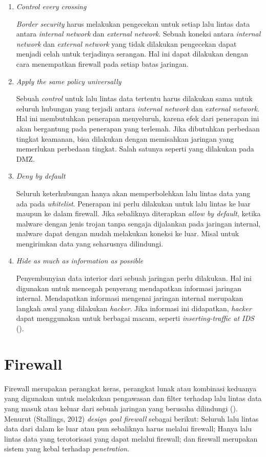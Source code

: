 \begin{enumerate}
	\item \textit{Control every crossing}
	
	\textit{Border security} harus melakukan pengecekan untuk setiap lalu lintas data antara \textit{internal network} dan \textit{external network}. Sebuah koneksi antara \textit{internal network} dan \textit{external network} yang tidak dilakukan pengecekan
	dapat menjadi celah untuk terjadinya serangan. Hal ini dapat dilakukan dengan cara menempatkan firewall pada setiap batas jaringan.
	
	\item \textit{Apply the same policy universally}
	
	Sebuah \textit{control} untuk lalu lintas data tertentu harus dilakukan sama untuk seluruh hubungan yang terjadi antara \textit{internal network} dan \textit{external network}. Hal ini membutuhkan penerapan menyeluruh, karena efek dari penerapan ini akan bergantung pada penerapan yang terlemah. Jika dibutuhkan perbedaan tingkat keamanan, bisa dilakukan dengan memisahkan jaringan yang memerlukan perbedaan tingkat. Salah satunya seperti yang dilakukan pada DMZ.
	
	\item \textit{Deny by default}
	
	Seluruh keterhubungan hanya akan memperbolehkan lalu lintas data yang ada pada \textit{whitelist}. Penerapan ini perlu dilakukan untuk lalu lintas ke luar	maupun ke dalam firewall. Jika sebaliknya diterapkan \textit{allow by default}, ketika malware dengan jenis trojan tanpa sengaja dijalankan pada jaringan internal, malware dapat dengan mudah melakukan koneksi ke luar. Misal untuk mengirimkan data yang seharusnya dilindungi.
	
	\item \textit{Hide as much as information as possible}
	
	Penyembunyian data interior dari sebuah jaringan perlu dilakukan. Hal ini digunakan untuk mencegah penyerang mendapatkan informasi jaringan internal. Mendapatkan informasi mengenai jaringan internal merupakan langkah awal yang dilakukan \textit{hacker}. Jika informasi ini didapatkan, \textit{hacker} dapat menggunakan untuk berbagai macam, seperti \textit{inserting-traffic at IDS} (\cite{marpaung2012survey}).
	
\end{enumerate}

\section{Firewall}
Firewall merupakan perangkat keras, perangkat lunak atau kombinasi keduanya yang digunakan untuk melakukan pengawasan dan filter terhadap lalu lintas data yang masuk atau keluar dari sebuah jaringan yang berusaha dilindungi (\cite{kizza2002computer}). Menurut (Stallings, 2012) \textit{design goal firewall} sebagai berikut: 
Seluruh lalu lintas data dari dalam ke luar atau pun sebaliknya harus melalui firewall;
Hanya lalu lintas data yang terotorisasi yang dapat melalui firewall;
dan firewall merupakan sistem yang kebal terhadap \textit{penetration}.

